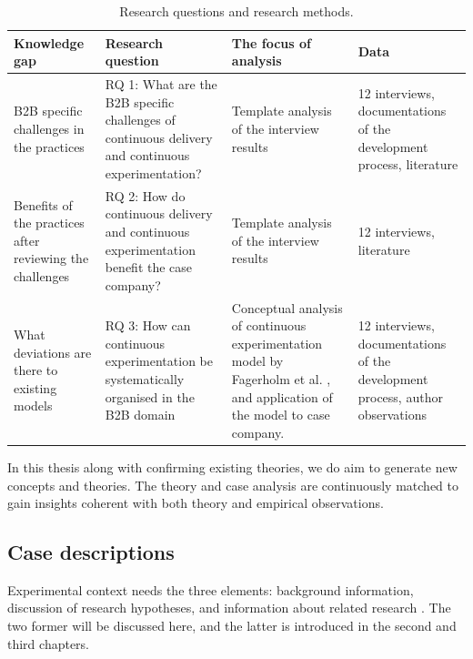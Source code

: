 \documentclass[english]{tktltiki2}
\theoremstyle{definition}
\theoremstyle{remark}
\begin{document}
\begin{center}
\begin{table}[htb]
    \begin{tabular}{ | p{3cm} | p{3cm} | p{3cm} | p{3cm} |}
    \hline
    \textbf{Knowledge gap} & \textbf{Research question} & \textbf{The focus of analysis} & \textbf{Data} \\ \hline
    B2B specific challenges in the practices & RQ 1: What are the B2B specific challenges of continuous delivery and continuous experimentation? & Template analysis of the interview results & 12 interviews, documentations of the development process, literature \\ \hline
    Benefits of the practices after reviewing the challenges & RQ 2: How do continuous delivery and continuous experimentation benefit the case company? & Template analysis of the interview results & 12 interviews, literature \\ \hline
    What deviations are there to existing models & RQ 3: How can continuous experimentation be systematically organised in the B2B domain & Conceptual analysis of continuous experimentation model by Fagerholm et al. \cite{fagerholm2014building}, and application of the model to case company. & 12 interviews, documentations of the development process, author observations \\ \hline
    \end{tabular}
    \caption{Research questions and research methods.}
    \end{table}
\end{center}

In this thesis along with confirming existing theories, we do aim to generate new concepts and theories. The theory and case analysis are continuously matched to gain insights coherent with both theory and empirical observations.

\subsection{Case descriptions} %

Experimental context needs the three elements: background information, discussion of research hypotheses, and information about related research \cite{kitchenham2002preliminary}. The two former will be discussed here, and the latter is introduced in the second and third chapters.
\end{document}
